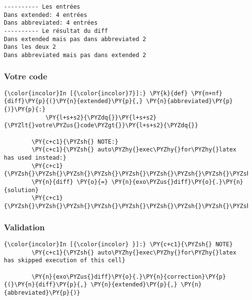     \begin{Verbatim}[commandchars=\\\{\},frame=single,framerule=0.3mm,rulecolor=\color{cellframecolor}]
---------- Les entrées
Dans extended: 4 entrées
Dans abbreviated: 4 entrées
---------- Le résultat du diff
Dans extended mais pas dans abbreviated 2
Dans les deux 2
Dans abbreviated mais pas dans extended 2
\end{Verbatim}

    \hypertarget{votre-code}{%
\subsubsection{Votre code}\label{votre-code}}

    \begin{Verbatim}[commandchars=\\\{\},frame=single,framerule=0.3mm,rulecolor=\color{cellframecolor}]
{\color{incolor}In [{\color{incolor}7}]:} \PY{k}{def} \PY{n+nf}{diff}\PY{p}{(}\PY{n}{extended}\PY{p}{,} \PY{n}{abbreviated}\PY{p}{)}\PY{p}{:}
            \PY{l+s+s2}{\PYZdq{}}\PY{l+s+s2}{\PYZlt{}votre\PYZus{}code\PYZgt{}}\PY{l+s+s2}{\PYZdq{}}
        
        \PY{c+c1}{\PYZsh{} NOTE:}
        \PY{c+c1}{\PYZsh{} auto\PYZhy{}exec\PYZhy{}for\PYZhy{}latex has used instead:}
        \PY{c+c1}{\PYZsh{}\PYZsh{}\PYZsh{}\PYZsh{}\PYZsh{}\PYZsh{}\PYZsh{}\PYZsh{}\PYZsh{}\PYZsh{}}
        \PY{n}{diff} \PY{o}{=} \PY{n}{exo\PYZus{}diff}\PY{o}{.}\PY{n}{solution}
        \PY{c+c1}{\PYZsh{}\PYZsh{}\PYZsh{}\PYZsh{}\PYZsh{}\PYZsh{}\PYZsh{}\PYZsh{}\PYZsh{}\PYZsh{}}
\end{Verbatim}


    \hypertarget{validation}{%
\subsubsection{Validation}\label{validation}}

    \begin{Verbatim}[commandchars=\\\{\},frame=single,framerule=0.3mm,rulecolor=\color{cellframecolor}]
{\color{incolor}In [{\color{incolor} }]:} \PY{c+c1}{\PYZsh{} NOTE}
        \PY{c+c1}{\PYZsh{} auto\PYZhy{}exec\PYZhy{}for\PYZhy{}latex has skipped execution of this cell}
        
        \PY{n}{exo\PYZus{}diff}\PY{o}{.}\PY{n}{correction}\PY{p}{(}\PY{n}{diff}\PY{p}{,} \PY{n}{extended}\PY{p}{,} \PY{n}{abbreviated}\PY{p}{)}
\end{Verbatim}


